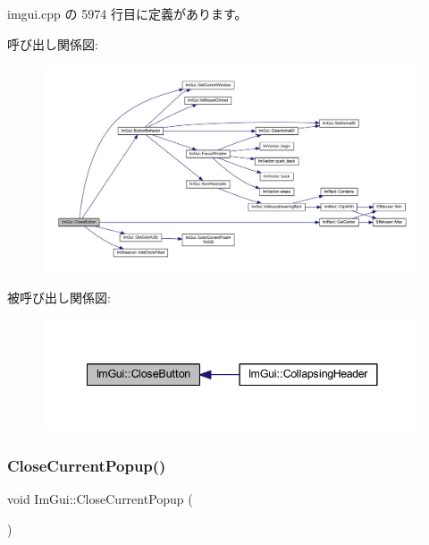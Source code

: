  imgui.\+cpp の 5974 行目に定義があります。

呼び出し関係図\+:\nopagebreak
\begin{figure}[H]
\begin{center}
\leavevmode
\includegraphics[width=350pt]{namespace_im_gui_a5e8e4df6418dcda3c4c5d15ecdf7d968_cgraph}
\end{center}
\end{figure}
被呼び出し関係図\+:\nopagebreak
\begin{figure}[H]
\begin{center}
\leavevmode
\includegraphics[width=341pt]{namespace_im_gui_a5e8e4df6418dcda3c4c5d15ecdf7d968_icgraph}
\end{center}
\end{figure}
\mbox{\label{namespace_im_gui_aeaec6479834db7918260fc082107f90b}} 
\subsubsection{\texorpdfstring{Close\+Current\+Popup()}{CloseCurrentPopup()}}
{\footnotesize\ttfamily void Im\+Gui\+::\+Close\+Current\+Popup (\begin{DoxyParamCaption}{ }\end{DoxyParamCaption})}



